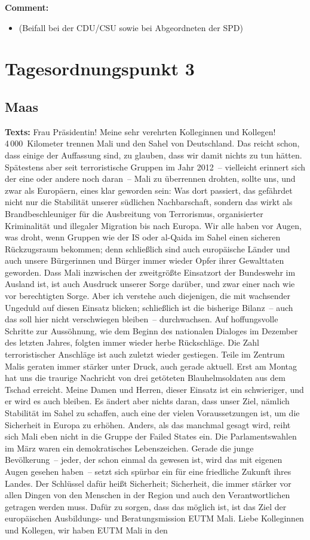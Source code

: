 \documentclass{article}
\begin{document}
\noindent\textbf{Comment:}
\begin{itemize}
    \setlength\itemsep{-3pt}
    \item (Beifall bei der CDU/CSU sowie bei Abgeordneten der SPD)
\end{itemize}
\section{Tagesordnungspunkt 3}
\subsection{Maas}
\noindent\textbf{Texts:} Frau Präsidentin! Meine sehr verehrten Kolleginnen und Kollegen! 4 000 Kilometer trennen Mali und den Sahel von Deutschland. Das reicht schon, dass einige der Auffassung sind, zu glauben, dass wir damit nichts zu tun hätten. Spätestens aber seit terroristische Gruppen im Jahr 2012 – vielleicht erinnert sich der eine oder andere noch daran – Mali zu überrennen drohten, sollte uns, und zwar als Europäern, eines klar geworden sein: Was dort passiert, das gefährdet nicht nur die Stabilität unserer südlichen Nachbarschaft, sondern das wirkt als Brandbeschleuniger für die Ausbreitung von Terrorismus, organisierter Kriminalität und illegaler Migration bis nach Europa. Wir alle haben vor Augen, was droht, wenn Gruppen wie der IS oder al-Qaida im Sahel einen sicheren Rückzugsraum bekommen; denn schließlich sind auch europäische Länder und auch unsere Bürgerinnen und Bürger immer wieder Opfer ihrer Gewalttaten geworden. Dass Mali inzwischen der zweitgrößte Einsatzort der Bundeswehr im Ausland ist, ist auch Ausdruck unserer Sorge darüber, und zwar einer nach wie vor berechtigten Sorge. Aber ich verstehe auch diejenigen, die mit wachsender Ungeduld auf diesen Einsatz blicken; schließlich ist die bisherige Bilanz – auch das soll hier nicht verschwiegen bleiben – durchwachsen. Auf hoffungsvolle Schritte zur Aussöhnung, wie dem Beginn des nationalen Dialoges im Dezember des letzten Jahres, folgten immer wieder herbe Rückschläge. Die Zahl terroristischer Anschläge ist auch zuletzt wieder gestiegen. Teile im Zentrum Malis geraten immer stärker unter Druck, auch gerade aktuell. Erst am Montag hat uns die traurige Nachricht von drei getöteten Blauhelmsoldaten aus dem Tschad erreicht. Meine Damen und Herren, dieser Einsatz ist ein schwieriger, und er wird es auch bleiben. Es ändert aber nichts daran, dass unser Ziel, nämlich Stabilität im Sahel zu schaffen, auch eine der vielen Voraussetzungen ist, um die Sicherheit in Europa zu erhöhen. Anders, als das manchmal gesagt wird, reiht sich Mali eben nicht in die Gruppe der Failed States ein. Die Parlamentswahlen im März waren ein demokratisches Lebenszeichen. Gerade die junge Bevölkerung – jeder, der schon einmal da gewesen ist, wird das mit eigenen Augen gesehen haben – setzt sich spürbar ein für eine friedliche Zukunft ihres Landes. Der Schlüssel dafür heißt Sicherheit; Sicherheit, die immer stärker vor allen Dingen von den Menschen in der Region und auch den Verantwortlichen getragen werden muss. Dafür zu sorgen, dass das möglich ist, ist das Ziel der europäischen Ausbildungs- und Beratungsmission EUTM Mali. Liebe Kolleginnen und Kollegen, wir haben EUTM Mali in den 
\end{document}
